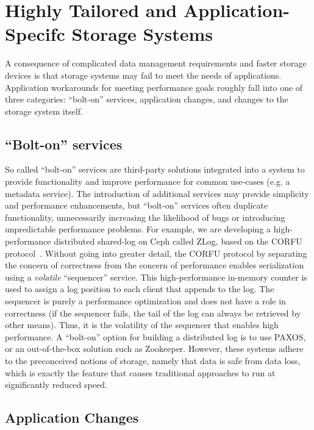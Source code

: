 \documentclass[10pt,twocolumn]{article}
\begin{document}
\section{Highly Tailored and Application-Specifc Storage
Systems}\label{highly-tailored-and-application-specifc-storage-systems}

\label{problem}

A consequence of complicated data management requirements and faster storage
devices is that storage systems may fail to meet the needs of applications.
Application workarounds for meeting performance goals roughly fall into one of
three categories: ``bolt-on'' services, application changes, and changes to
the storage system itself.

\subsection{\texorpdfstring{``Bolt-on''
services}{Bolt-on services}}\label{bolt-on-services}

So called ``bolt-on'' services are third-party solutions integrated into a
system to provide functionality and improve performance for common use-cases
(e.g. a metadata service). The introduction of additional services may provide
simplicity and performance enhancements, but ``bolt-on'' services often
duplicate functionality, unnecessarily increasing the likelihood of bugs or
introducing unpredictable performance problems. For example, we are developing
a high-performance distributed shared-log on Ceph called ZLog, based on the
CORFU protocol~\cite{corfu}. Without going into greater detail, the CORFU protocol by separating the concern of correctness from the concern of performance enables serialization using a \emph{volatile}
``sequencer'' service. This high-performance in-memory counter is used to assign a log
position to each client that appends to the log. The sequencer is purely a performance optimization and does not have a role in correctness (if the sequencer fails, the tail of the log can always be retrieved by other means). Thus, it is the volatility of the sequencer that enables high performance. A ``bolt-on'' option for building
a distributed log is to use PAXOS, or an out-of-the-box solution such as
Zookeeper. However, these systems adhere to the preconceived notions of
storage, namely that data is safe from data loss, which is exactly the feature
that causes traditional approaches to run at significantly reduced speed. 

\subsection{Application Changes}\label{application-changes}
\end{document}
